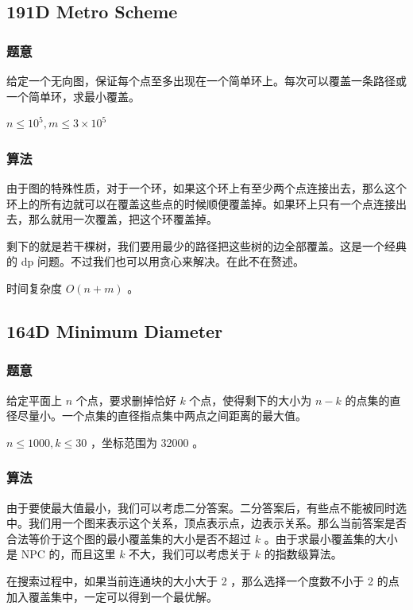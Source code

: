 \documentclass[11pt]{article}
\begin{document}
\subsection{191D  Metro Scheme}
\label{sec-7-5}
\subsubsection{题意}
\label{sec-7-5-1}

    给定一个无向图，保证每个点至多出现在一个简单环上。每次可以覆盖一条路径或一个简单环，求最小覆盖。

    $n \leq 10^5, m \leq 3 \times 10^5$
\subsubsection{算法}
\label{sec-7-5-2}

    由于图的特殊性质，对于一个环，如果这个环上有至少两个点连接出去，那么这个环上的所有边就可以在覆盖这些点的时候顺便覆盖掉。如果环上只有一个点连接出去，那么就用一次覆盖，把这个环覆盖掉。

    剩下的就是若干棵树，我们要用最少的路径把这些树的边全部覆盖。这是一个经典的 dp 问题。不过我们也可以用贪心来解决。在此不在赘述。

    时间复杂度 $O(n +m)$ 。
\subsection{164D  Minimum Diameter}
\label{sec-7-6}
\subsubsection{题意}
\label{sec-7-6-1}

    给定平面上 $n$ 个点，要求删掉恰好 $k$ 个点，使得剩下的大小为 $n - k$ 的点集的直径尽量小。一个点集的直径指点集中两点之间距离的最大值。

    $n \leq 1000, k \leq 30$ ，坐标范围为 32000 。
\subsubsection{算法}
\label{sec-7-6-2}

    由于要使最大值最小，我们可以考虑二分答案。二分答案后，有些点不能被同时选中。我们用一个图来表示这个关系，顶点表示点，边表示关系。那么当前答案是否合法等价于这个图的最小覆盖集的大小是否不超过 $k$ 。由于求最小覆盖集的大小是 NPC 的，而且这里 $k$ 不大，我们可以考虑关于 $k$ 的指数级算法。

\begin{theorem}
  \label{thr:164D}
  在搜索过程中，如果当前连通块的大小大于 2 ，那么选择一个度数不小于 2 的点加入覆盖集中，一定可以得到一个最优解。
\end{theorem}
\end{document}
